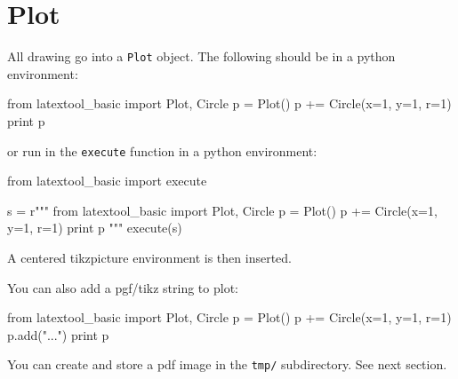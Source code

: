 \section{Plot}

All drawing go into a \verb!Plot! object.
The following should be in a python environment:
\begin{console}
from latextool_basic import Plot, Circle
p = Plot()
p += Circle(x=1, y=1, r=1)
print p
\end{console}
or run in the \verb!execute! function in a python environment:
\begin{console}
from latextool_basic import execute

s = r"""
from latextool_basic import Plot, Circle
p = Plot()
p += Circle(x=1, y=1, r=1)
print p
"""
execute(s)
\end{console}

A centered tikzpicture environment is then inserted.

You can also add a pgf/tikz string to plot:
\begin{console}
from latextool_basic import Plot, Circle
p = Plot()
p += Circle(x=1, y=1, r=1)
p.add("\draw ...")
print p
\end{console}

You can create and store a pdf image in the \verb!tmp/! subdirectory.
See next section.
